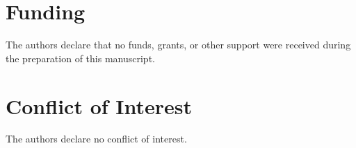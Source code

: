 \documentclass[journal]{IEEEtran}
\begin{document}
\section*{Funding}

The authors declare that no funds, grants, or other support were received during the preparation of this manuscript.

\section*{Conflict of Interest}

The authors declare no conflict of interest.

\end{document}
